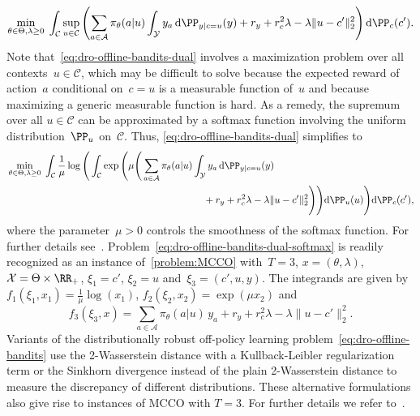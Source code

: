 \documentclass[11pt]{article}
\begin{document}
    \begin{align}
        \label{eq:dro-offline-bandits-dual}
        \min_{\theta\in\Theta,\lambda\geq 0} \; \int_{\mathcal C} \sup_{u\in\mathcal C} \left(\sum_{a\in\mathcal A} \pi_\theta(a|u) \int_{\mathcal Y} y_a\, {\rm d} \PP_{y|c=u}(y) +r_y + r_c^2\lambda -\lambda\|u-c'\|_2^2 \right) {\rm d}\PP_{c}(c').
    \end{align}
    Note that~\eqref{eq:dro-offline-bandits-dual} involves a maximization problem over all contexts~$u\in\mathcal C$, which may be difficult to solve because the expected reward of action~$a$ conditional on~$c=u$ is a measurable function of~$u$ and because maximizing a generic measurable function is hard. As a remedy, the supremum over all $u\in\mathcal C$ can be approximated by a softmax function involving the uniform distribution~$\PP_u$ on~$\mathcal C$. Thus, \eqref{eq:dro-offline-bandits-dual} simplifies to
    \begin{equation}
    \label{eq:dro-offline-bandits-dual-softmax}
    \begin{aligned}
        & \min_{\theta\in\Theta,\lambda\geq 0} \; \int_{\mathcal C} \frac{1}{\mu} \log \Bigg(\int_{\mathcal C} \exp\Bigg( \mu \Bigg(\sum_{a\in\mathcal A} \pi_\theta(a|u) \int_{\mathcal Y} y_a\, {\rm d} \PP_{y|c=u}(y) \\
        & \hspace{7cm} +r_y +r_c^2\lambda -\lambda\|u-c'\|^2_2 \Bigg) \Bigg) {\rm d} \PP_{u}(u) \Bigg) {\rm d}\PP_{c}(c'),
    \end{aligned}
    \end{equation}
    where the parameter~$\mu>0$ controls the smoothness of the softmax function. For further details see~\citep{shen2024wasserstein}. Problem~\eqref{eq:dro-offline-bandits-dual-softmax} is readily recognized as an instance of~\eqref{problem:MCCO} with~$T=3$, $x=(\theta,\lambda)$, $\mathcal X=\Theta\times \RR_+$, $\xi_1=c'$, $\xi_2=u$ and~$\xi_3=(c',u, y)$. The integrands are given by $f_1(\xi_1,x_1)= \frac{1}{\mu} \log(x_1)$, $f_2(\xi_2,x_2)= \exp(\mu x_2)$ and
    \[
        f_3(\xi_3,x) = \sum_{a\in\mathcal A} \pi_\theta(a|u)\, y_a +r_y +r_c^2\lambda -\lambda\|u-c'\|^2_2.
    \]
    Variants of the distributionally robust off-policy learning problem~\eqref{eq:dro-offline-bandits} use the 2-Wasserstein distance with a Kullback-Leibler regularization term \citep{azizian2023regularization} or the Sinkhorn divergence \citep{wang2021sinkhorn} instead of the plain 2-Wasserstein distance to measure the discrepancy of different distributions. These alternative formulations also give rise to instances of MCCO with $T=3$. For further details we refer to~\citep[Appendix~D]{wang2021sinkhorn}. 
    
\end{document}
